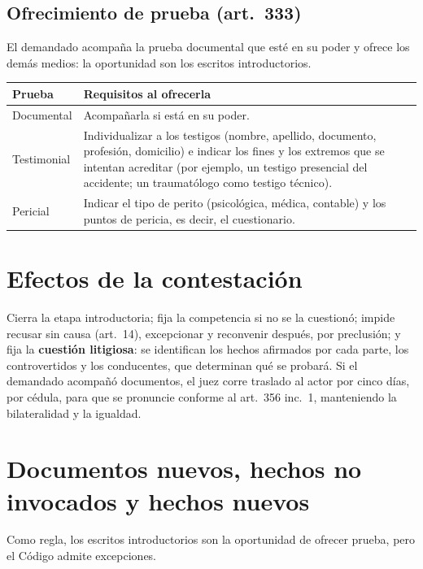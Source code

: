 \documentclass[12pt,oneside]{book}
\renewcommand{\arraystretch}{1.15}
\begin{document}
\subsection{Ofrecimiento de prueba (art.~333)}

El demandado acompaña la prueba documental que esté en su poder y ofrece los demás medios: la oportunidad son los escritos introductorios.

\begin{table}[H]
\centering
\renewcommand{\arraystretch}{1.25}
\begin{tabularx}{\textwidth}{>{\RaggedRight\arraybackslash}p{}>{\RaggedRight\arraybackslash}X}
\toprule
\textbf{Prueba} & \textbf{Requisitos al ofrecerla} \\
\midrule
Documental & Acompañarla si está en su poder. \\
Testimonial & Individualizar a los testigos (nombre, apellido, documento, profesión, domicilio) e indicar los fines y los extremos que se intentan acreditar (por ejemplo, un testigo presencial del accidente; un traumatólogo como testigo técnico). \\
Pericial & Indicar el tipo de perito (psicológica, médica, contable) y los puntos de pericia, es decir, el cuestionario. \\
\bottomrule
\end{tabularx}
\end{table}

\section{Efectos de la contestación}

Cierra la etapa introductoria; fija la competencia si no se la cuestionó; impide recusar sin causa (art.~14), excepcionar y reconvenir después, por preclusión; y fija la \textbf{cuestión litigiosa}: se identifican los hechos afirmados por cada parte, los controvertidos y los conducentes, que determinan qué se probará. Si el demandado acompañó documentos, el juez corre traslado al actor por cinco días, por cédula, para que se pronuncie conforme al art.~356 inc.~1, manteniendo la bilateralidad y la igualdad.

\section{Documentos nuevos, hechos no invocados y hechos nuevos}

Como regla, los escritos introductorios son la oportunidad de ofrecer prueba, pero el Código admite excepciones.
\end{document}
